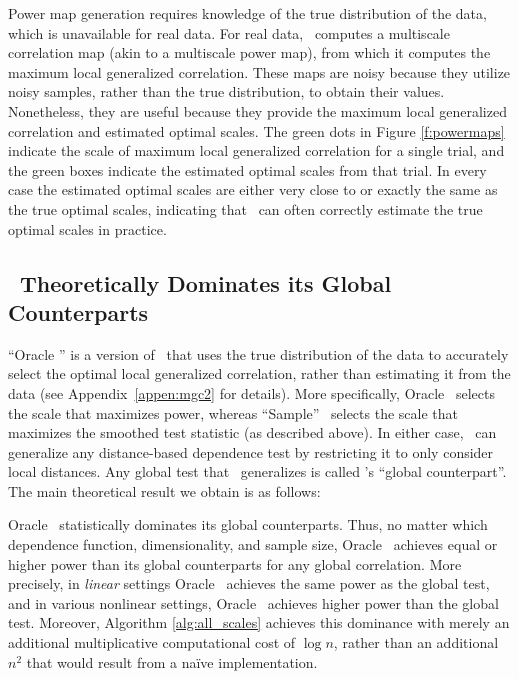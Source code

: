 \documentclass[11pt]{article}
\begin{document}
Power map generation requires knowledge of the true distribution of the data, which is unavailable for real data.
For real data, \Mgc~computes a multiscale correlation map (akin to a multiscale power map), from which it computes the maximum local generalized correlation.  These maps are noisy because they utilize noisy samples, rather than the true distribution, to obtain their values.  Nonetheless, they are useful because they provide the maximum local generalized correlation and estimated optimal scales.  The green dots in Figure \ref{f:powermaps} indicate the scale of maximum local generalized correlation for a single trial, and the green boxes indicate the estimated optimal scales from that trial.  In every case the estimated optimal scales are either very close to or exactly the same as the true optimal scales, indicating that \Mgc~can often correctly estimate the true optimal scales in practice.





\subsection*{\Mgc~Theoretically Dominates its Global Counterparts}
\label{s:theory}

``Oracle \Mgc'' is a version of \Mgc~that uses the true distribution of the data to accurately select the optimal local generalized correlation, rather than estimating it from the data (see Appendix~\ref{appen:mgc2} for details). More specifically, Oracle \Mgc~selects the scale that maximizes power, whereas ``Sample'' \Mgc~selects the scale that maximizes the smoothed test statistic (as described above). 
In either case,  \Mgc~can generalize any distance-based dependence test by restricting it to only consider local distances.  Any global test that \Mgc~generalizes is called \Mgc's ``global counterpart''.  The main theoretical result we obtain is as follows:
% 
\begin{thm} \label{t:dominate}
Oracle \Mgc~statistically dominates its global counterparts. Thus, no matter which 
dependence function, dimensionality, and sample size, 
Oracle \Mgc~achieves equal or higher power than its global counterparts for any global correlation.  More precisely, in \emph{linear} settings Oracle \Mgc~achieves the same power as the global test, and in various nonlinear settings, Oracle \Mgc~achieves {higher} power than the global test. Moreover, Algorithm \ref{alg:all_scales} achieves this dominance with merely an additional multiplicative computational cost of $\log n$, rather than an additional $n^2$ that would result from a na\"ive implementation.
\end{thm}
\end{document}
